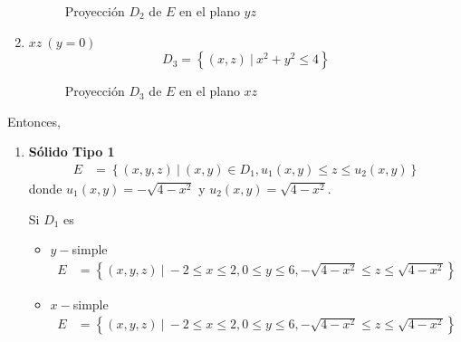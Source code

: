 \documentclass[12pt]{exam}
\begin{document}
\begin{questions}
\begin{enumerate}
\begin{figure}[H]
\begin{tikzpicture}
      \end{tikzpicture}
      \caption{Proyección $D_2$ de $E$ en el plano $yz$}
    \end{figure}

  \item $xz ~ (y=0)$
    \[
    D_3 = \left\{ (x,z) ~|~ x^2+y^2 \leq 4 \right\}
    \]

    \begin{figure}[H]
      \centering
      \caption{Proyección $D_3$ de $E$ en el plano $xz$}
    \end{figure}
  \end{enumerate}

  Entonces,
  
  \begin{enumerate}
  \item \textbf{Sólido Tipo 1}
    \begin{align*}
      E &= \left\{ (x,y,z) ~|~ (x,y) \in D_1, u_1(x,y) \leq z \leq u_2(x,y) \right\}
    \end{align*}
    donde $u_1(x,y) = -\sqrt{4-x^2}$ y $u_2(x,y) = \sqrt{4-x^2}$.

    Si $D_1$ es 

    \begin{itemize}
    \item $y-$simple
      \begin{align*}
        E &= \left\{ (x,y,z) ~|~ -2 \leq x \leq 2, 0 \leq y \leq 6, -\sqrt{4-x^2} \leq z \leq \sqrt{4-x^2} \right\}
      \end{align*}

    \item $x-$simple
      \begin{align*}
        E &= \left\{ (x,y,z) ~|~ -2 \leq x \leq 2, 0 \leq y \leq 6, -\sqrt{4-x^2} \leq z \leq \sqrt{4-x^2} \right\}
      \end{align*}
    \end{itemize}


\end{enumerate}
\end{questions}
\end{document}
